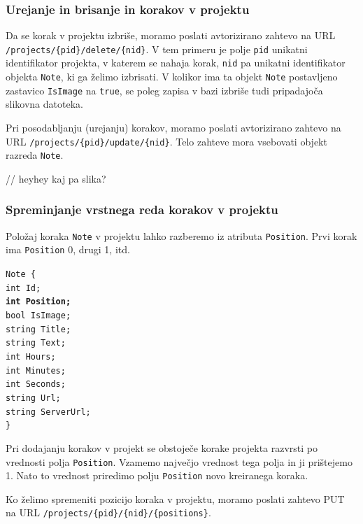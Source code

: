 \documentclass[a4paper, 12pt]{book}
\begin{document}
\subsubsection{Urejanje in brisanje in korakov v projektu}

Da se korak v projektu izbriše, moramo poslati avtorizirano zahtevo na URL \texttt{/projects/\{pid\}/delete/\{nid\}}.
V tem primeru je polje \texttt{pid} unikatni identifikator projekta, v katerem se nahaja korak, \texttt{nid} pa unikatni identifikator objekta \texttt{Note}, ki ga želimo izbrisati.
V kolikor ima ta objekt \texttt{Note} postavljeno zastavico \texttt{IsImage} na \texttt{true}, se poleg zapisa v bazi izbriše tudi pripadajoča slikovna datoteka.

Pri posodabljanju (urejanju) korakov, moramo poslati avtorizirano zahtevo na URL \texttt{/projects/\{pid\}/update/\{nid\}}.
Telo zahteve mora vsebovati objekt razreda \texttt{Note}.

// heyhey kaj pa slika?

\subsubsection{Spreminjanje vrstnega reda korakov v projektu}

Položaj koraka \texttt{Note} v projektu lahko razberemo iz atributa \texttt{Position}.
Prvi korak ima \texttt{Position} 0, drugi 1, itd.

\noindent \texttt{Note \{ \\
int Id; \\
\textbf{int Position;} \\
bool IsImage;  \\
string Title; \\
string Text; \\
int Hours; \\
int Minutes; \\
int Seconds; \\
string Url; \\
string ServerUrl; \\
\}
}

Pri dodajanju korakov v projekt se obstoječe korake projekta razvrsti po vrednosti polja \texttt{Position}.
Vzamemo največjo vrednost tega polja in ji prištejemo 1.
Nato to vrednost priredimo polju \texttt{Position} novo kreiranega koraka.

Ko želimo spremeniti pozicijo koraka v projektu, moramo poslati zahtevo PUT na URL \texttt{/projects/\{pid\}/\{nid\}/\{positions\}}.
\end{document}

